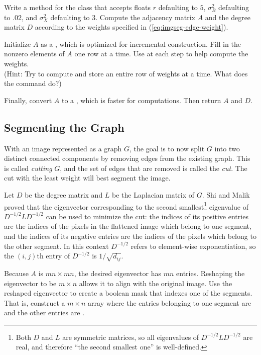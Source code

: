 \begin{problem}
Write a method for the  class that accepts floats $r$ defaulting to $5$, $\sigma_B^2$ defaulting to $.02$, and $\sigma_X^2$ defaulting to $3$.
Compute the adjacency matrix $A$ and the degree matrix $D$ according to the weights specified in (\ref{eq:imgseg-edge-weight}).

Initialize $A$ as a , which is optimized for incremental construction.
Fill in the nonzero elements of $A$ one row at a time.
Use  at each step to help compute the weights.
\\(Hint: Try to compute and store an entire row of weights at a time.
What does the command  do?)

Finally, convert $A$ to a , which is faster for computations.
Then return $A$ and $D$.
\label{prob:imgseg-compute-adjacency}
\end{problem}

\subsection*{Segmenting the Graph} %

With an image represented as a graph $G$, the goal is to now split $G$ into two distinct connected components by removing edges from the existing graph.
This is called \emph{cutting} $G$, and the set of edges that are removed is called the \emph{cut}.
The cut with the least weight will best segment the image.

Let $D$ be the degree matrix and $L$ be the Laplacian matrix of $G$.
Shi and Malik \cite{Shi2000} proved that the eigenvector corresponding to the second smallest\footnote{Both $D$ and $L$ are symmetric matrices, so all eigenvalues of $D^{-1/2}LD^{-1/2}$ are real, and therefore ``the second smallest one'' is well-defined.} eigenvalue of $D^{-1/2}LD^{-1/2}$ can be used to minimize the cut: the indices of its positive entries are the indices of the pixels in the flattened image which belong to one segment, and the indices of its negative entries are the indices of the pixels which belong to the other segment.
In this context $D^{-1/2}$ refers to element-wise exponentiation, so the $(i,j)$th entry of $D^{-1/2}$ is $1/\sqrt{d_{ij}}$.

Because $A$ is $mn\times mn$, the desired eigenvector has $mn$ entries.
Reshaping the eigenvector to be $m \times n$ allows it to align with the original image.
Use the reshaped eigenvector to create a boolean mask that indexes one of the segments.
That is, construct a $m\times n$ array where the entries belonging to one segment are  and the other entries are .

